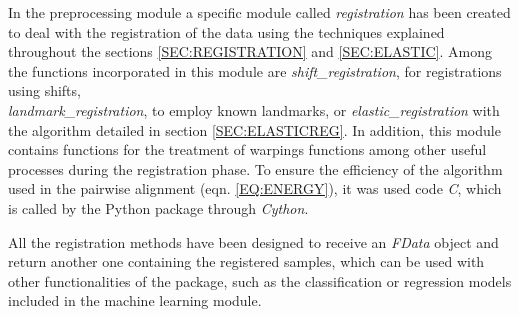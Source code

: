 
In the preprocessing module a specific module called \textit{registration} has
been created to deal with the registration of the data using the techniques
explained throughout the sections \ref{SEC:REGISTRATION} and \ref{SEC:ELASTIC}.
Among the functions incorporated in this module are \textit{shift\_registration},
for registrations using shifts,\\ \textit{landmark\_registration},
to employ known landmarks, or \textit{elastic\_registration} with the algorithm
detailed in section \ref{SEC:ELASTICREG}.
In addition, this module contains functions for the treatment of
warpings functions among other useful processes during the registration phase.
To ensure the efficiency of the algorithm used in the pairwise alignment
(eqn. \ref{EQ:ENERGY}), it was used code \textit{C},
which is called by the Python package through \textit{Cython}.

All the registration methods have been designed to receive an \textit{FData} object and
return another one containing the registered samples, which can be used with
other functionalities of the package, such as the classification or regression
models included in the machine learning module.

